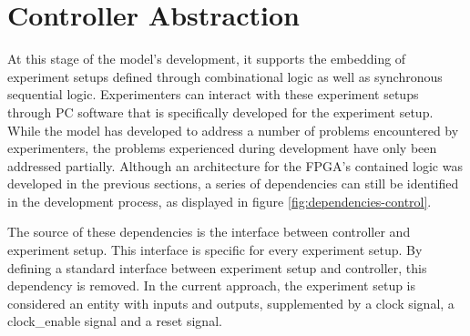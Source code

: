 \documentclass[openright]{uva-bachelor-thesis}
\begin{document}










\section{Controller Abstraction}
\label{sectioncontrollerabstraction}

At this stage of the model's development, it supports the embedding of experiment setups defined through combinational logic as well as synchronous sequential logic. Experimenters can interact with these experiment setups through PC software that is specifically developed for the experiment setup. While the model has developed to address a number of problems encountered by experimenters, the problems experienced during development have only been addressed partially. Although an architecture for the FPGA's contained logic was developed in the previous sections, a series of dependencies can still be identified in the development process, as displayed in figure \ref{fig:dependencies-control}.  

The source of these dependencies is the interface between controller and experiment setup. This interface is specific for every experiment setup. By defining a standard interface between experiment setup and controller, this dependency is removed. In the current approach, the experiment setup is considered an entity with inputs and outputs, supplemented by a clock signal, a clock\_enable signal and a reset signal. 
\end{document}
